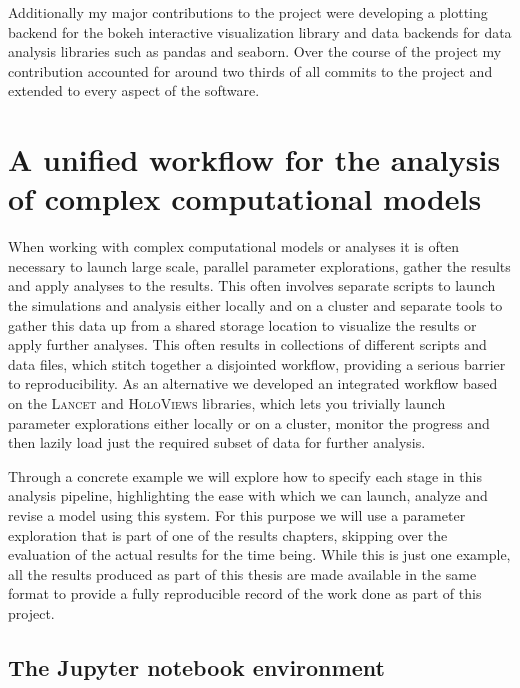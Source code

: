 Additionally my major contributions to the project were developing a
plotting backend for the bokeh interactive visualization library and
data backends for data analysis libraries such as pandas and
seaborn. Over the course of the project my contribution accounted for
around two thirds of all commits to the project and extended to every
aspect of the software.

\section{A unified workflow for the analysis of complex computational models}

When working with complex computational models or analyses it is often
necessary to launch large scale, parallel parameter explorations,
gather the results and apply analyses to the results. This often
involves separate scripts to launch the simulations and analysis
either locally and on a cluster and separate tools to gather this data
up from a shared storage location to visualize the results or apply
further analyses. This often results in collections of different
scripts and data files, which stitch together a disjointed workflow,
providing a serious barrier to reproducibility. As an alternative we
developed an integrated workflow based on the \textsc{Lancet} and
\textsc{\textsc{HoloViews}} libraries, which lets you trivially launch
parameter explorations either locally or on a cluster, monitor the
progress and then lazily load just the required subset of data for
further analysis.

Through a concrete example we will explore how to specify each stage in
this analysis pipeline, highlighting the ease with which we can
launch, analyze and revise a model using this system. For this purpose
we will use a parameter exploration that is part of one of the results
chapters, skipping over the evaluation of the actual results for the
time being. While this is just one example, all the results produced
as part of this thesis are made available in the same format to
provide a fully reproducible record of the work done as part of this
project.

\subsection{The Jupyter notebook environment}

